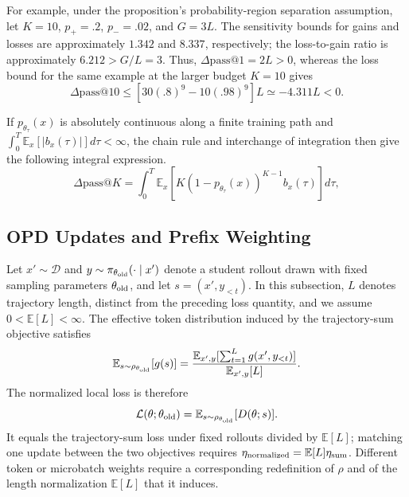 \documentclass{article}
\theoremstyle{opdplain}
\begin{document}
For example, under the proposition's probability-region separation assumption, let $K=10$, $p_{+}=.2$, $p_{-}=.02$, and $G=3L$. The sensitivity bounds for gains and losses are approximately $1.342$ and $8.337$, respectively; the loss-to-gain ratio is approximately $6.212>G/L=3$. Thus, $\Delta\mathrm{pass}@1=2L>0$, whereas the loss bound for the same example at the larger budget $K=10$ gives
\[
 \Delta\mathrm{pass}@10\le[30(.8)^9-10(.98)^9]L
 \simeq-4.311L<0.
\]

If $p_{\theta_\tau}(x)$ is absolutely continuous along a finite training path and $\int_0^T\mathbb E_x[|b_x(\tau)|]d\tau<\infty$, the chain rule and interchange of integration then give the following integral expression.
\begin{equation}
\label{eq:opd-metric-path}
 \Delta\mathrm{pass}@K=\int_0^T\mathbb E_x\!\left[
 K(1-p_{\theta_\tau}(x))^{K-1}b_x(\tau)\right]d\tau,
\end{equation}
\subsection{OPD Updates and Prefix Weighting}
\label{app:opd-normalization}

Let $x'\sim\mathcal D$ and $y\sim\pi_{\theta_{\rm old}}(\cdot\mid x')$ denote a student rollout drawn with fixed sampling parameters $\theta_{\rm old}$, and let $s=(x',y_{<t})$. In this subsection, $L$ denotes trajectory length, distinct from the preceding loss quantity, and we assume $0<\mathbb E[L]<\infty$. The effective token distribution induced by the trajectory-sum objective satisfies
\[
 \mathbb E_{s\sim\rho_{\theta_{\rm old}}}[g(s)]
 =\frac{\mathbb E_{x',y}[\sum_{t=1}^{L}g(x',y_{<t})]}{\mathbb E_{x',y}[L]}.
\]
The normalized local loss is therefore
\[
 \mathcal L(\theta;\theta_{\rm old})=
 \mathbb E_{s\sim\rho_{\theta_{\rm old}}}[D(\theta;s)].
\]
It equals the trajectory-sum loss under fixed rollouts divided by $\mathbb E[L]$; matching one update between the two objectives requires $\eta_{\rm normalized}=\mathbb E[L]\eta_{\rm sum}$. Different token or microbatch weights require a corresponding redefinition of $\rho$ and of the length normalization $\mathbb E[L]$ that it induces.
\end{document}
